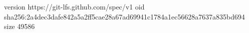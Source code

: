 version https://git-lfs.github.com/spec/v1
oid sha256:2a4dec3dafe842a5a2ff5cae28a67ad69941c1784a1ec56628a7637a835bd694
size 49586
